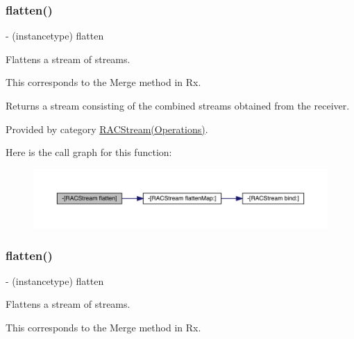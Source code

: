 \subsubsection{\texorpdfstring{flatten()}{flatten()}\hspace{0.1cm}{\footnotesize\ttfamily [1/3]}}
{\footnotesize\ttfamily -\/ (instancetype) flatten \begin{DoxyParamCaption}{ }\end{DoxyParamCaption}}

Flattens a stream of streams.

This corresponds to the {\ttfamily Merge} method in Rx.

Returns a stream consisting of the combined streams obtained from the receiver. 

Provided by category \mbox{\hyperlink{category_r_a_c_stream_07_operations_08_a02767823dfe3d4682709e066e15e388c}{R\+A\+C\+Stream(\+Operations)}}.

Here is the call graph for this function\+:\nopagebreak
\begin{figure}[H]
\begin{center}
\leavevmode
\includegraphics[width=350pt]{interface_r_a_c_stream_a02767823dfe3d4682709e066e15e388c_cgraph}
\end{center}
\end{figure}
\mbox{\label{interface_r_a_c_stream_a02767823dfe3d4682709e066e15e388c}} 
\subsubsection{\texorpdfstring{flatten()}{flatten()}\hspace{0.1cm}{\footnotesize\ttfamily [2/3]}}
{\footnotesize\ttfamily -\/ (instancetype) flatten \begin{DoxyParamCaption}{ }\end{DoxyParamCaption}}

Flattens a stream of streams.

This corresponds to the {\ttfamily Merge} method in Rx.

